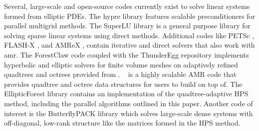 
Several, large-scale and open-source codes currently exist to solve linear systems formed from elliptic PDEs. The hypre library \citep{falgout2002hypre} features scalable preconditioners for parallel multigrid methods. The SuperLU library \citep{li2005superlu} is a general purpose library for solving sparse linear systems using direct methods. Additional codes like PETSc \citep{anl2023petsc}, FLASH-X \citep{dubey2022flash}, and AMReX \citep{zhang2019amrex}, contain iterative and direct solvers that also work with \gls{amr}. The ForestClaw code \citep{calhoun2017forestclaw} coupled with the ThunderEgg repository \citep{aiton2022thunderegg} implements hyperbolic and elliptic solvers for finite volume meshes on adaptively refined quadtrees and octrees provided from \pforest. \pforest\ \citep{burstedde2011p4est,burstedde2020parallel} is a highly scalable AMR code that provides quadtree and octree data structures for users to build on top of. The EllipticForest library \citep{chipman2024ellipticforest} contains an implementation of the quadtree-adaptive HPS method, including the parallel algorithms outlined in this paper. Another code of interest is the ButterflyPACK library \citep{liu2018butterflypack} which solves large-scale dense systems with off-diagonal, low-rank structure like the matrices formed in the HPS method.